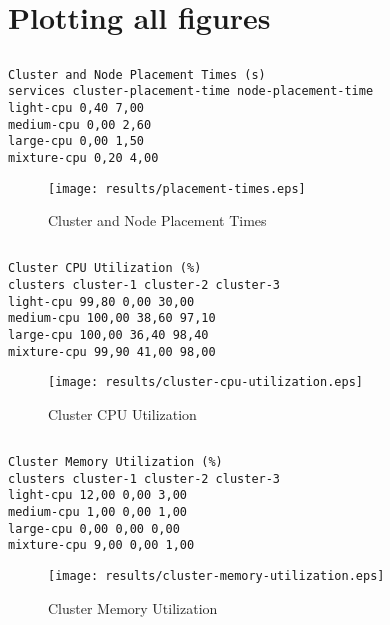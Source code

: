 \documentclass{elsart}
\begin{document}
\section{Plotting all figures}
\subsection{}

\begin{lstlisting}[caption={Cluster and Node Placement Times}]
Cluster and Node Placement Times (s)
services cluster-placement-time node-placement-time
light-cpu 0,40 7,00
medium-cpu 0,00 2,60
large-cpu 0,00 1,50
mixture-cpu 0,20 4,00
\end{lstlisting}

\begin{figure}[ht]
\centering
\texttt{[image: results/placement-times.eps]}
\caption{Cluster and Node Placement Times}\label{fig:placement-times.eps}
\end{figure}

\subsection{}

\begin{lstlisting}[caption={Cluster CPU Utilization}]
Cluster CPU Utilization (%)
clusters cluster-1 cluster-2 cluster-3
light-cpu 99,80 0,00 30,00
medium-cpu 100,00 38,60 97,10
large-cpu 100,00 36,40 98,40
mixture-cpu 99,90 41,00 98,00
\end{lstlisting}

\begin{figure}[ht]
\centering
\texttt{[image: results/cluster-cpu-utilization.eps]}
\caption{Cluster CPU Utilization}\label{fig:cluster-cpu-utilization.eps}
\end{figure}

\subsection{}

\begin{lstlisting}[caption={Cluster Memory Utilization}]
Cluster Memory Utilization (%)
clusters cluster-1 cluster-2 cluster-3
light-cpu 12,00 0,00 3,00
medium-cpu 1,00 0,00 1,00
large-cpu 0,00 0,00 0,00
mixture-cpu 9,00 0,00 1,00
\end{lstlisting}

\begin{figure}[ht]
\centering
\texttt{[image: results/cluster-memory-utilization.eps]}
\caption{Cluster Memory Utilization}\label{fig:cluster-memory-utilization.eps}
\end{figure}
\end{document}
